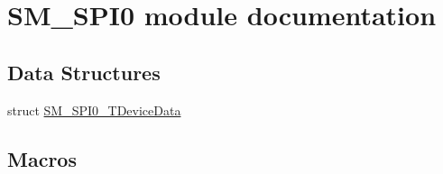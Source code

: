 \hypertarget{group___s_m___s_p_i0__module}{\section{S\-M\-\_\-\-S\-P\-I0 module documentation}
\label{group___s_m___s_p_i0__module}
}
\subsection*{Data Structures}
\begin{DoxyCompactItemize}
\item 
struct \hyperlink{struct_s_m___s_p_i0___t_device_data}{S\-M\-\_\-\-S\-P\-I0\-\_\-\-T\-Device\-Data}
\end{DoxyCompactItemize}
\subsection*{Macros}
